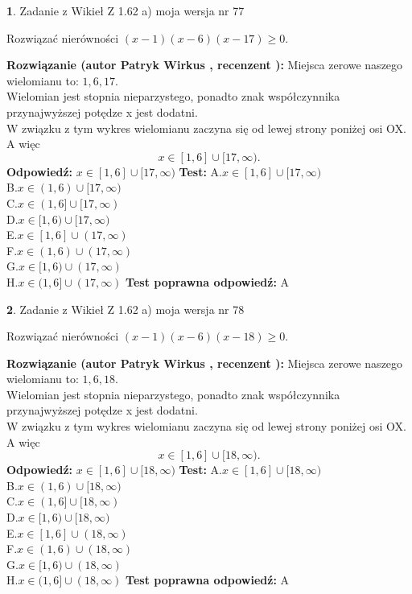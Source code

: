 \documentclass[12pt, a4paper]{article}
\theoremstyle{definition} %
\newtheorem{zad}{}
\newcommand{\zadStart}[1]{\begin{zad}#1\newline}
\newcommand{\zadStop}{\end{zad}}
\newcommand{\rozwStart}[2]{\noindent \textbf{Rozwiązanie (autor #1 , recenzent #2): }\newline}
\newcommand{\rozwStop}{\newline}
\newcommand{\odpStart}{\noindent \textbf{Odpowiedź:}\newline}
\newcommand{\odpStop}{\newline}
\newcommand{\testStart}{\noindent \textbf{Test:}\newline}
\newcommand{\testStop}{\newline}
\newcommand{\kluczStart}{\noindent \textbf{Test poprawna odpowiedź:}\newline}
\newcommand{\kluczStop}{\newline}
\begin{document}
\zadStart{Zadanie z Wikieł Z 1.62 a) moja wersja nr 77}

Rozwiązać nierówności $(x-1)(x-6)(x-17)\ge0$.
\zadStop
\rozwStart{Patryk Wirkus}{}
Miejsca zerowe naszego wielomianu to: $1, 6, 17$.\\
Wielomian jest stopnia nieparzystego, ponadto znak współczynnika przy\linebreak najwyższej potędze x jest dodatni.\\ W związku z tym wykres wielomianu zaczyna się od lewej strony poniżej osi OX. A więc $$x \in [1,6] \cup [17,\infty).$$
\rozwStop
\odpStart
$x \in [1,6] \cup [17,\infty)$
\odpStop
\testStart
A.$x \in [1,6] \cup [17,\infty)$\\
B.$x \in (1,6) \cup [17,\infty)$\\
C.$x \in (1,6] \cup [17,\infty)$\\
D.$x \in [1,6) \cup [17,\infty)$\\
E.$x \in [1,6] \cup (17,\infty)$\\
F.$x \in (1,6) \cup (17,\infty)$\\
G.$x \in [1,6) \cup (17,\infty)$\\
H.$x \in (1,6] \cup (17,\infty)$
\testStop
\kluczStart
A
\kluczStop



\zadStart{Zadanie z Wikieł Z 1.62 a) moja wersja nr 78}

Rozwiązać nierówności $(x-1)(x-6)(x-18)\ge0$.
\zadStop
\rozwStart{Patryk Wirkus}{}
Miejsca zerowe naszego wielomianu to: $1, 6, 18$.\\
Wielomian jest stopnia nieparzystego, ponadto znak współczynnika przy\linebreak najwyższej potędze x jest dodatni.\\ W związku z tym wykres wielomianu zaczyna się od lewej strony poniżej osi OX. A więc $$x \in [1,6] \cup [18,\infty).$$
\rozwStop
\odpStart
$x \in [1,6] \cup [18,\infty)$
\odpStop
\testStart
A.$x \in [1,6] \cup [18,\infty)$\\
B.$x \in (1,6) \cup [18,\infty)$\\
C.$x \in (1,6] \cup [18,\infty)$\\
D.$x \in [1,6) \cup [18,\infty)$\\
E.$x \in [1,6] \cup (18,\infty)$\\
F.$x \in (1,6) \cup (18,\infty)$\\
G.$x \in [1,6) \cup (18,\infty)$\\
H.$x \in (1,6] \cup (18,\infty)$
\testStop
\kluczStart
A
\kluczStop
\end{document}

